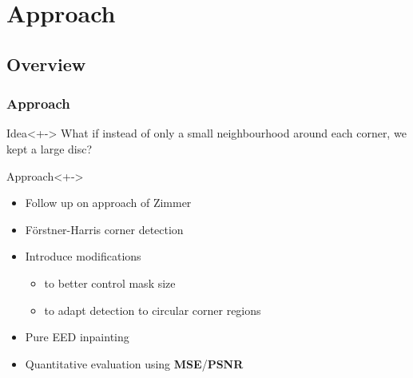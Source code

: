 \documentclass{beamer}
\begin{document}
    \section{Approach}
    \subsection{Overview}
    \begin{frame}[t]
        \frametitle{Approach}
        \begin{block}{Idea}<+->
            What if instead of only a small neighbourhood around each corner, we kept a large disc?  
        \end{block}
        \begin{block}{Approach}<+->
            \begin{itemize}
                \item Follow up on approach of Zimmer
                \item Förstner-Harris corner detection 
                \item Introduce modifications
                    \begin{itemize}
                        \item to better control mask size
                        \item to adapt detection to circular corner regions
                    \end{itemize}
                \item Pure EED inpainting
                \item Quantitative evaluation using \textbf{MSE}/\textbf{PSNR}
            \end{itemize}
        \end{block}
    \end{frame}
\end{document}
